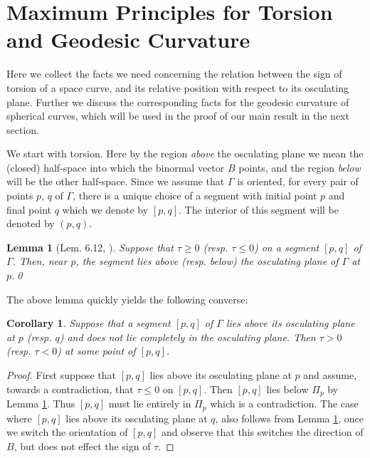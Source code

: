 \documentclass[11pt]{amsart}
\newtheorem{lem}[thm]{Lemma}
\newtheorem{cor}[thm]{Corollary}
\theoremstyle{definition}
\renewcommand{\(}{\left(}
\renewcommand{\)}{\right)}
\begin{document}
\section{Maximum Principles for Torsion and Geodesic Curvature}

Here we collect the facts we need concerning the relation between the sign of torsion of a space curve, and its relative position with respect to its osculating plane. Further we discuss the corresponding facts for the geodesic curvature of spherical curves, which will be used in the proof of our main result in the next section.


We start with torsion. Here by the region \emph{above} the osculating plane we mean the (closed) half-space into which the binormal vector $B$ points, and the region \emph{below} will be the other half-space. Since we assume that $\Gamma$ is oriented, for every pair of points $p$, $q$ of $\Gamma$, there is a unique choice of a segment with initial point $p$ and final point $q$ which we denote by $[p,q]$. The interior of this segment will be denoted by $(p,q)$.

\begin{lem}[Lem. 6.12, \cite{ghomi:rosenberg}]\label{lem:maxprincipletorsion}
Suppose that $\tau\geq  0$ (resp. $\tau\leq 0$) on a segment $[p, q]$ of $\Gamma$. Then, near $p$,  the segment lies above (resp. below) the osculating plane of $\Gamma$ at $p$.\qed
\end{lem}

The above lemma quickly yields the following converse:

\begin{cor}\label{cor:maxprincipletorsion}
Suppose that a segment $[p,q]$ of $\Gamma$ lies above its osculating  plane at $p$ (resp. $q$) and does not lie completely in the osculating plane. Then $\tau >0$ (resp. $\tau<0$) at some point of $[p,q]$.
\end{cor}
\begin{proof}
First suppose that $[p,q]$ lies above its osculating plane at $p$ and assume, towards a contradiction, that $\tau\leq 0$ on $[p,q]$. Then $[p,q]$ lies below $\Pi_p$ by Lemma \ref{lem:maxprincipletorsion}. Thus $[p,q]$ must lie entirely in $\Pi_p$ which is a contradiction. The case where $[p,q]$ lies above its osculating plane at $q$, also follows from Lemma \ref{lem:maxprincipletorsion}, once we switch the orientation of $[p,q]$ and observe that this switches the direction of $B$, but does not effect the sign of $\tau$.
\end{proof}
\end{document}
